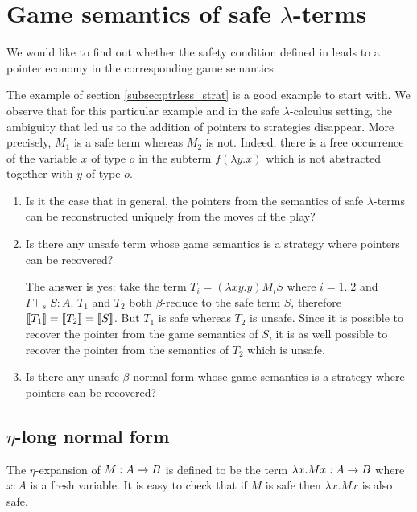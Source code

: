 \def\aux#1{\lceil #1\rceil}
\def\nf#1{\eta_{\sf nf}(#1)}

\section{Game semantics of safe $\lambda$-terms}

We would like to find out whether the safety condition defined in
\cite{Ong2005} leads to a pointer economy in the corresponding game
semantics.

The example of section \ref{subsec:ptrless_strat} is a good example
to start with. We observe that for this particular example and in
the safe $\lambda$-calculus setting, the ambiguity that led us to
the addition of pointers to strategies disappear. More precisely,
$M_1$ is a safe term whereas $M_2$ is not. Indeed, there is a free
occurrence of the variable $x$ of type $o$ in the subterm $f
(\lambda y . x)$ which is not abstracted together with $y$ of type
$o$.


\begin{enumerate}
\item
Is it the case that in general, the pointers from the semantics of
safe $\lambda$-terms can be reconstructed uniquely from the moves of
the play?


\item
Is there any unsafe term whose game semantics is a strategy where
pointers can be recovered?

The answer is yes: take the term $T_i = (\lambda x y . y) M_i S$
where $i =1..2$ and $\Gamma \vdash_s S : A$. $T_1$ and $T_2$ both
$\beta$-reduce to the safe term $S$, therefore
${[\![ T_1 ]\!]}={[\![ T_2 ]\!]}={[\![ S ]\!]}$. But $T_1$ is safe whereas $T_2$ is
unsafe. Since it is possible to recover the pointer from the game
semantics of $S$, it is as well possible to recover the pointer from
the semantics of $T_2$ which is unsafe.

\item
Is there any unsafe $\beta$-normal form whose game semantics is a
strategy where pointers can be recovered?


\end{enumerate}






\subsection{$\eta$-long normal form}

The $\eta$-expansion of $M: A\rightarrow B$ is defined to be the term $\lambda x . M x : A\rightarrow B$ where $x:A$ is a fresh variable.
It is easy to check that if $M$ is safe then $\lambda x . M x$ is also safe.


